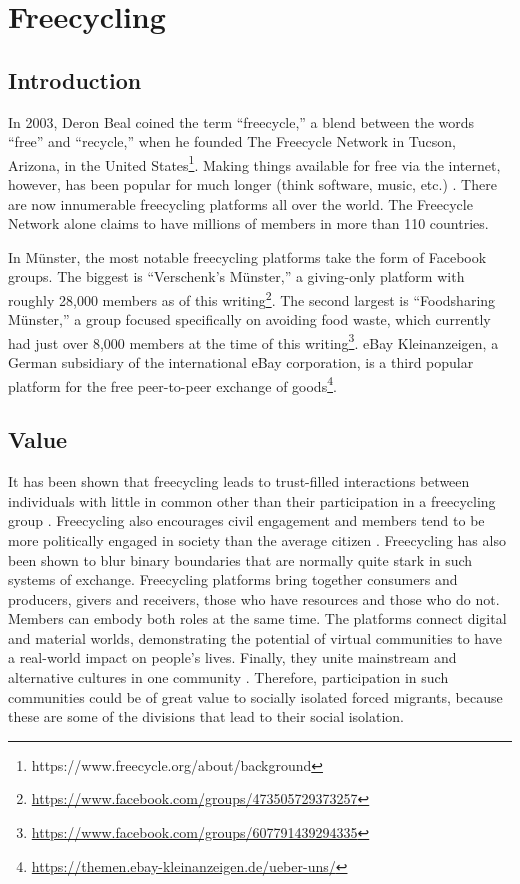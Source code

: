 \section{Freecycling}
\label{sec:freecycling}

\subsection*{Introduction}

In 2003, Deron Beal coined the term ``freecycle,'' a blend between the words ``free'' and ``recycle,'' when he founded The Freecycle Network in Tucson, Arizona, in the United States\footnote{https://www.freecycle.org/about/background}. Making things available for free via the internet, however, has been popular for much longer (think software, music, etc.) \cite{eden_blurring_2017}. There are now innumerable freecycling platforms all over the world. The Freecycle Network alone claims to have millions of members in more than 110 countries.

In Münster, the most notable freecycling platforms take the form of Facebook groups. The biggest is ``Verschenk's Münster,'' a giving-only platform with roughly 28,000 members as of this writing\footnote{\url{https://www.facebook.com/groups/473505729373257}}. The second largest is ``Foodsharing Münster,'' a group focused specifically on avoiding food waste, which currently had just over 8,000 members at the time of this writing\footnote{\url{https://www.facebook.com/groups/607791439294335}}. eBay Kleinanzeigen, a German subsidiary of the international eBay corporation, is a third popular platform for the free peer-to-peer exchange of goods\footnote{\url{https://themen.ebay-kleinanzeigen.de/ueber-uns/}}.

\subsection*{Value}

It has been shown that freecycling leads to trust-filled interactions between individuals with little in common other than their participation in a freecycling group \cite{nelson_trash_2009}. Freecycling also encourages civil engagement and members tend to be more politically engaged in society than the average citizen \cite{nelson_downshifting_2007}. Freecycling has also been shown to blur binary boundaries that are normally quite stark in such systems of exchange. Freecycling platforms bring together consumers and producers, givers and receivers, those who have resources and those who do not. Members can embody both roles at the same time. The platforms connect digital and material worlds, demonstrating the potential of virtual communities to have a real-world impact on people's lives. Finally, they unite mainstream and alternative cultures in one community \cite{eden_blurring_2017}. Therefore, participation in such communities could be of great value to socially isolated forced migrants, because these are some of the divisions that lead to their social isolation.

